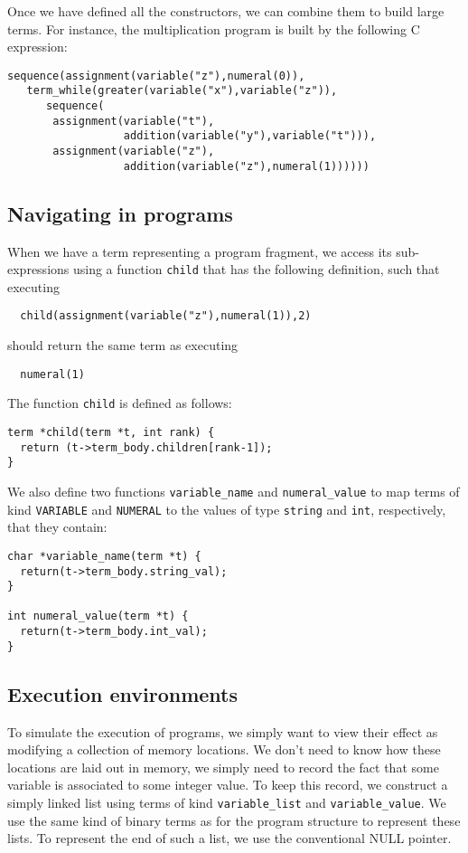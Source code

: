 \documentclass{book}
\begin{document}
Once we have defined all the constructors, we can combine them to build
large terms.  For instance, the multiplication program is built by
the following C expression:

\begin{verbatim}
sequence(assignment(variable("z"),numeral(0)),
   term_while(greater(variable("x"),variable("z")),
      sequence(
       assignment(variable("t"),
                  addition(variable("y"),variable("t"))),
       assignment(variable("z"),
                  addition(variable("z"),numeral(1))))))
\end{verbatim}
\subsection{Navigating in programs}
When we have a term representing a program fragment, we access its
sub-expressions using a function {\tt child} that has the following
definition, such that executing
\begin{verbatim}
  child(assignment(variable("z"),numeral(1)),2)
\end{verbatim}
should return the same term as executing
\begin{verbatim}
  numeral(1)
\end{verbatim}
The function {\tt child} is defined as follows:
\begin{verbatim}
term *child(term *t, int rank) {
  return (t->term_body.children[rank-1]);
}
\end{verbatim}

We also define two functions {\tt variable\_name} and
{\tt numeral\_value} to map terms of kind {\tt VARIABLE} and
{\tt NUMERAL} to the values of type {\tt string} and {\tt int},
respectively, that they contain:
\begin{verbatim}
char *variable_name(term *t) {
  return(t->term_body.string_val);
}

int numeral_value(term *t) {
  return(t->term_body.int_val);
}
\end{verbatim}
\subsection{Execution environments}
To simulate the execution of programs, we simply want to view their
effect as modifying a collection of memory locations.  We don't need
to know how these locations are laid out in memory, we simply need
to record the fact that some variable is associated to some integer
value.  To keep this record, we construct a simply linked list using terms
of kind {\tt variable\_list} and {\tt variable\_value}.  We
use the same kind of binary terms as for the program structure to
represent these lists.  To represent the end of such a list, we use the
conventional NULL pointer.
\end{document}
